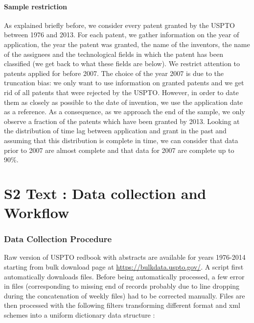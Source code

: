 \documentclass[12pt,twoside,a4paper]{article}
\begin{document}
\paragraph*{Sample restriction}
As explained briefly before, we consider every patent granted by the USPTO between 1976 and 2013. For each patent, we gather information on the year of application, the year the patent was granted, the name of the inventors, the name of the assignees and the technological fields in which the patent has been classified (we get back to what these fields are below). We restrict attention to patents applied for before 2007. The choice of the year 2007 is due to the truncation bias: we only want to use information on granted patents and we get rid of all patents that were rejected by the USPTO. However, in order to date them as closely as possible to the date of invention, we use the application date as a reference. As a consequence, as we approach the end of the sample, we only observe a fraction of the patents which have been granted by 2013. Looking at the distribution of time lag between application and grant in the past and assuming that this distribution is complete in time, we can consider that data prior to 2007 are almost complete and that data for 2007 are complete up to 90\%.







\newpage







\section*{S2 Text : Data collection and Workflow}

\label{supp:data}

\subsubsection*{Data Collection Procedure}

Raw version of USPTO redbook with abstracts are available for years 1976-2014 starting from bulk download page at \url{https://bulkdata.uspto.gov/}. A script first automatically downloads files. Before being automatically processed, a few error in files (corresponding to missing end of records probably due to line dropping during the concatenation of weekly files) had to be corrected manually. Files are then processed with the following filters transforming different format and xml schemes into a uniform dictionary data structure :
\end{document}
